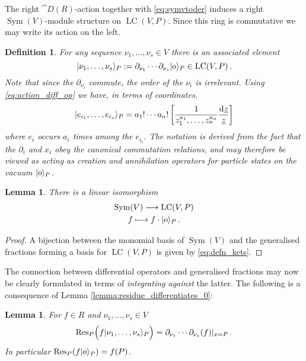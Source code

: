 \documentclass[english,letter paper,12pt,reqno]{article}
\DeclarePairedDelimiter\ket{\lvert}{\rangle}
\newtheorem{lemma}[theorem]{Lemma}
\theoremstyle{example}
\newtheorem{definition}[theorem]{Definition}
\numberwithin{equation}{section}
\DeclareMathOperator{\Sym}{Sym}
\DeclareMathOperator{\LC}{LC}
\begin{document}
The right $\cat{D}(R)$-action together with \eqref{eq:symvtoder} induces a right $\Sym(V)$-module structure on $\LC(V,P)$. Since this ring is commutative we may write its action on the left.

\begin{definition} For any sequence $\nu_1,\ldots,\nu_s \in V$ there is an associated element
\begin{equation}\label{eq:s_particle_state}
\ket{ \nu_1, \ldots, \nu_s }_P := \partial_{\nu_1} \cdots \partial_{\nu_s} \ket{o}_P \in \LC(V,P)\,.
\end{equation}
Note that since the $\partial_{\nu_i}$ commute, the order of the $\nu_i$ is irrelevant. Using \eqref{eq:action_diff_op} we have, in terms of coordinates,
\begin{equation}\label{eq:defn_kets}
\ket{ e_{i_1}, \ldots, e_{i_s} }_P = a_1! \cdots a_n! \left[ \frac{1}{z_1^{a_1}, \ldots, z_n^{a_n}} \frac{\ud{\underline{z}}}{\underline{z}} \right]
\end{equation}
where $e_i$ occurs $a_i$ times among the $e_{i_t}$. The notation is derived from the fact that the $\partial_i$ and $x_i$ obey the canonical commutation relations, and may therefore be viewed as acting as creation and annihilation operators for particle states on the vacuum $\ket{o}_P$.
\end{definition}

\begin{lemma}\label{lemma:iso_fock} There is a linear isomorphism 
\begin{gather*}
\Sym(V) \lto \LC(V, P)\\
f \longmapsto f \cdot \ket{o}_P\,.
\end{gather*}
\end{lemma}
\begin{proof}
A bijection between the monomial basis of $\Sym(V)$ and the generalised fractions forming a basis for $\LC(V,P)$ is given by \eqref{eq:defn_kets}.
\end{proof}

The connection between differential operators and generalised fractions may now be clearly formulated in terms of \emph{integrating against} the latter. The following is a consequence of Lemma \ref{lemma:residue_differentiates_0}:

\begin{lemma}\label{lemma:residue_differentiates} For $f \in R$ and $\nu_1,\ldots,\nu_s \in V$
\begin{equation}\label{eq:residue_differentiates}
\Res_P\Big( f \ket{\nu_1,\ldots,\nu_s}_P \Big) = \partial_{\nu_1} \cdots \partial_{\nu_s}( f )|_{x = P}\,.
\end{equation}
In particular $\Res_P( f \ket{o}_P ) = f(P)$.
\end{lemma}
\end{document}
